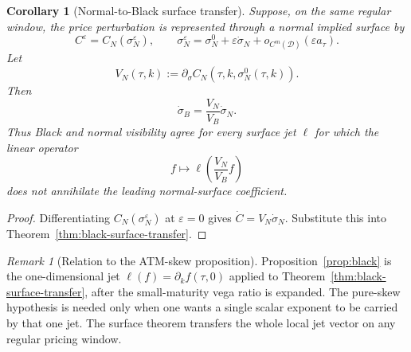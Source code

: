 \documentclass[11pt,a4paper]{amsart}
\theoremstyle{plain}
\newtheorem{corollary}[theorem]{Corollary}
\theoremstyle{definition}
\theoremstyle{remark}
\newtheorem{remark}[theorem]{Remark}
\newcommand{\cD}{\mathcal{D}}
\begin{document}
\begin{corollary}[Normal-to-Black surface transfer]\label{cor:normal-black-surface}
Suppose, on the same regular window, the price perturbation is represented through a normal implied
surface by
\[
        C^\varepsilon=C_N(\sigma_N^\varepsilon),
        \qquad
        \sigma_N^\varepsilon=
        \sigma_N^0+
        \varepsilon\dot\sigma_N+o_{C^m(\cD)}(\varepsilon a_\tau).
\]
Let
\[
        V_N(\tau,k):=\partial_\sigma C_N(\tau,k,\sigma_N^0(\tau,k)).
\]
Then
\[
        \dot\sigma_B
        =
        \frac{V_N}{V_B}\dot\sigma_N.
\]
Thus Black and normal visibility agree for every surface jet \(\ell\) for which the linear
operator
\[
        f\mapsto \ell\!\left(\frac{V_N}{V_B}f\right)
\]
does not annihilate the leading normal-surface coefficient.
\end{corollary}

\begin{proof}
Differentiating \(C_N(\sigma_N^\varepsilon)\) at \(\varepsilon=0\) gives
\(\dot C=V_N\dot\sigma_N\).  Substitute this into
Theorem~\ref{thm:black-surface-transfer}.
\end{proof}

\begin{remark}[Relation to the ATM-skew proposition]\label{rem:black-surface-atm}
Proposition~\ref{prop:black} is the one-dimensional jet
\(\ell(f)=\partial_k f(\tau,0)\) applied to Theorem~\ref{thm:black-surface-transfer}, after the
small-maturity vega ratio is expanded.  The pure-skew hypothesis is needed only when one wants a
single scalar exponent to be carried by that one jet.  The surface theorem transfers the whole
local jet vector on any regular pricing window.
\end{remark}



\end{document}
